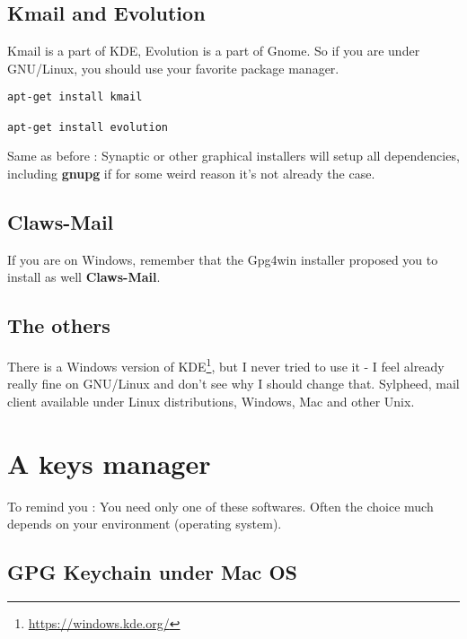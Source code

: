 \subsection{Kmail and Evolution}\label{kmail-and-evolution}

Kmail is a part of KDE, Evolution is a part of Gnome. So if you are
under GNU/Linux, you should use your favorite package manager.

\begin{lstlisting}
apt-get install kmail

apt-get install evolution
\end{lstlisting}

Same as before : Synaptic or other graphical installers will setup all
dependencies, including \textbf{gnupg} if for some weird reason it's not
already the case.

\subsection{Claws-Mail}\label{claws-mail}

If you are on Windows, remember that the Gpg4win installer proposed you
to install as well \textbf{Claws-Mail}.

\subsection{The others}\label{the-others}

There is a Windows version of KDE\footnote{\url{https://windows.kde.org/}}, but I never tried to use it - I feel already really fine on GNU/Linux and
don't see why I should change that. Sylpheed, mail client available under Linux distributions, Windows, Mac
and other Unix.

\section{A keys manager}\label{a-keys-manager}

\begin{notice}
To remind you : You need only one of these softwares. Often the choice
much depends on your environment (operating system).
\end{notice}

\subsection{GPG Keychain under Mac OS}\label{gpg-keychain-under-mac-os}

